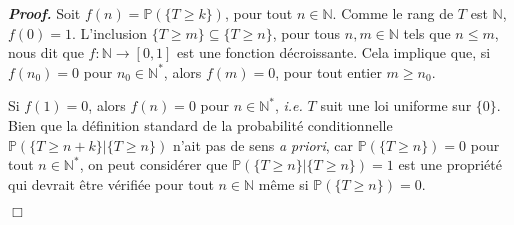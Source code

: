 \documentclass[11pt,a4paper]{article}
\newcommand{\NN}{\mathbb{N}}
\newenvironment{preuve}[1][]
{\vskip 2mm  \noindent\emph{\bf Proof#1. }}{$\Box$ \vskip 2mm}
\let\geq\geqslant
\let\leq\leqslant
\begin{document}
		\begin{preuve}
			Soit $f(n) = \mathbb{P}(\{ T\geq k \})$, pour tout $n \in \NN$. 
			Comme le rang de $T$ est $\NN$, $f(0) = 1$. 
			L'inclusion $\{T \geq m \} \subseteq  \{T \geq n\}$, pour tous $n, m \in \NN$ tels que $n \leq m$, nous dit que $f : \NN \rightarrow [0,1]$ est une fonction décroissante. 
			Cela implique que, si $f(n_{0})= 0$ pour $n_{0} \in \NN^{*}$, alors $f(m) = 0$, pour tout entier $m \geq n_{0}$.
			
			Si $f(1) = 0$, alors $f(n)= 0$ pour $n \in \NN^{*}$, \textit{i.e.} $T$ suit une loi uniforme sur $\{ 0 \}$. 
			Bien que la définition standard de la probabilité conditionnelle $\mathbb{P}( \{T \geq n+k \} | \{T \geq n\} )$ n'ait pas de sens \textit{a priori}, car $\mathbb{P}(\{ T\geq n \}) = 0$ pour tout $n \in \NN^{*}$, on peut considérer que $\mathbb{P}( \{T \geq n \} | \{T \geq n\} ) = 1$ est une propriété qui devrait être vérifiée pour tout $n \in \NN$ même si $\mathbb{P}(\{ T\geq n \}) = 0$. 
			

\end{preuve}
\end{document}
